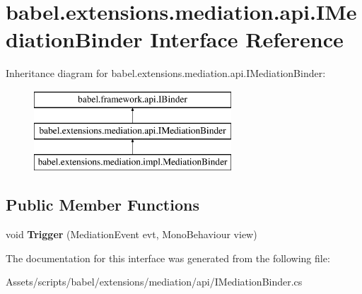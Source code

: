 \hypertarget{interfacebabel_1_1extensions_1_1mediation_1_1api_1_1_i_mediation_binder}{\section{babel.\-extensions.\-mediation.\-api.\-I\-Mediation\-Binder Interface Reference}
\label{interfacebabel_1_1extensions_1_1mediation_1_1api_1_1_i_mediation_binder}
}
Inheritance diagram for babel.\-extensions.\-mediation.\-api.\-I\-Mediation\-Binder\-:\begin{figure}[H]
\begin{center}
\leavevmode
\includegraphics[height=3.000000cm]{interfacebabel_1_1extensions_1_1mediation_1_1api_1_1_i_mediation_binder}
\end{center}
\end{figure}
\subsection*{Public Member Functions}
\begin{DoxyCompactItemize}
\item 
\hypertarget{interfacebabel_1_1extensions_1_1mediation_1_1api_1_1_i_mediation_binder_aa8c422d5184ac7001a64a98706fe82bf}{void {\bfseries Trigger} (Mediation\-Event evt, Mono\-Behaviour view)}\label{interfacebabel_1_1extensions_1_1mediation_1_1api_1_1_i_mediation_binder_aa8c422d5184ac7001a64a98706fe82bf}

\end{DoxyCompactItemize}


The documentation for this interface was generated from the following file\-:\begin{DoxyCompactItemize}
\item 
Assets/scripts/babel/extensions/mediation/api/I\-Mediation\-Binder.\-cs\end{DoxyCompactItemize}
